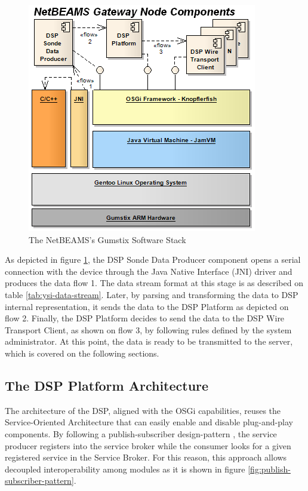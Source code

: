 \begin{figure}[h]
  \centering
  \includegraphics[scale=0.6]{../diagrams/NetBEAMS-Client-Node-Components}
  \caption{The NetBEAMS's Gumstix Software Stack}
  \label{fig:netbeams-software-stack}
\end{figure}

As depicted in figure \ref{fig:netbeams-software-stack}, the DSP Sonde Data
Producer component opens a serial connection with the device through the Java
Native Interface (JNI) driver and produces the data flow 1. The data stream
format at this stage is as described on table \ref{tab:ysi-data-stream}.
Later, by parsing and transforming the data to DSP internal representation, it
sends the data to the DSP Platform as depicted on flow 2. Finally, the DSP
Platform decides to send the data to the DSP Wire Transport Client, as shown
on flow 3, by following rules defined by the system administrator. At this
point, the data is ready to be transmitted to the server, which is covered on
the following sections.

\subsection{The DSP Platform Architecture}
\label{netbeams-architecture}

The architecture of the DSP, aligned with the OSGi capabilities, reuses the
Service-Oriented Architecture that can easily enable and disable plug-and-play
components. By following a publish-subscriber design-pattern \cite{gof}, the
service producer registers into the service broker while the consumer looks
for a given registered service in the Service Broker. For this reason, this
approach allows decoupled interoperability among modules as it is shown in
figure \ref{fig:publish-subscriber-pattern}.

